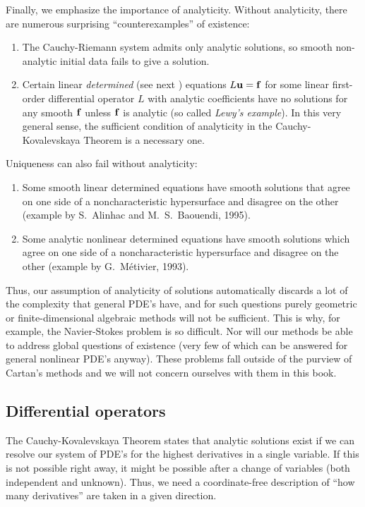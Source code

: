 Finally, we emphasize the importance of analyticity. Without analyticity, there are numerous surprising ``counterexamples'' of existence:
\begin{enumerate}
    \item The Cauchy-Riemann system admits only analytic solutions, so smooth non-analytic initial data fails to give a solution.
    \item Certain linear \emph{determined} (see next \subsect) equations $L\bf{u}=\bf{f}$ for some linear first-order differential operator $L$ with analytic coefficients have no solutions for any smooth $\bf{f}$ unless $\bf{f}$ is analytic (so called \emph{Lewy's example}). In this very general sense, the sufficient condition of analyticity in the Cauchy-Kovalevskaya Theorem is a necessary one.
\end{enumerate}
Uniqueness can also fail without analyticity:
\begin{enumerate}
    \item Some smooth linear determined equations have smooth solutions that agree on one side of a noncharacteristic hypersurface and disagree on the other (example by S.~Alinhac and M.~S.~Baouendi, 1995).
    \item Some analytic nonlinear determined equations have smooth solutions which agree on one side of a noncharacteristic hypersurface and disagree on the other (example by G.~M\'etivier, 1993).
\end{enumerate}

Thus, our assumption of analyticity of solutions automatically discards a lot of the complexity that general PDE's have, and for such questions purely geometric or finite-dimensional algebraic methods will not be sufficient. This is why, for example, the Navier-Stokes problem is so difficult. Nor will our methods be able to address global questions of existence (very few of which can be answered for general nonlinear PDE's anyway). These problems fall outside of the purview of Cartan's methods and we will not concern ourselves with them in this book.









\subsection{Differential operators}


The Cauchy-Kovalevskaya Theorem states that analytic solutions exist if we can resolve our system of PDE's for the highest derivatives in a single variable. If this is not possible right away, it might be possible after a change of variables (both independent and unknown). Thus, we need a coordinate-free description of ``how many derivatives'' are taken in a given direction.

